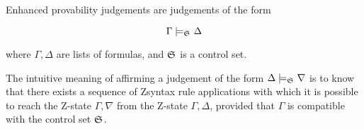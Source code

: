 \begin{definition}
  Enhanced provability judgements are judgements of the form

  \[
    \Gamma \models_{\mathfrak{S}_{}} \Delta
  \]

  where $\Gamma, \Delta$ are lists of formulas, and $\mathfrak{S}_{}$ is a control
  set.
\end{definition}


The intuitive meaning of affirming a judgement of the form
$\Delta \models_{\mathfrak{S}_{}} \nabla$ is to know that there exists a sequence of
Zsyntax rule applications with which it is possible to reach the Z-state
$\Gamma, \nabla$ from the Z-state $\Gamma, \Delta$, provided that $\Gamma$ is
compatible with the control set $\mathfrak{S}_{}$.





